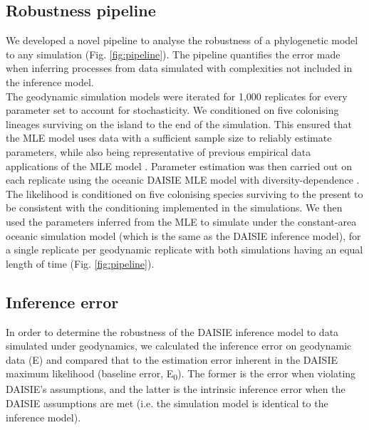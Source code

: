 \documentclass{article}
\begin{document}
\subsection*{Robustness pipeline}

We developed a novel pipeline to analyse the robustness of a phylogenetic model to any simulation (Fig. \ref{fig:pipeline}). The pipeline quantifies the error made when inferring processes from data simulated with complexities not included in the inference model. \\

The geodynamic simulation models were iterated for 1,000 replicates for every parameter set to account for stochasticity. We conditioned on five colonising lineages surviving on the island to the end of the simulation. This ensured that the MLE model uses data with a sufficient sample size to reliably estimate parameters, while also being representative of previous empirical data applications of the MLE model \citep{valente_using_2018}. Parameter estimation was then carried out on each replicate using the oceanic DAISIE MLE model with diversity-dependence \citep{valente_equilibrium_2015}. The likelihood is conditioned on five colonising species surviving to the present to be consistent with the conditioning implemented in the simulations. We then used the parameters inferred from the MLE to simulate under the constant-area oceanic simulation model (which is the same as the DAISIE inference model), for a single replicate per geodynamic replicate with both simulations having an equal length of time (Fig. \ref{fig:pipeline}). 

\subsection*{Inference error}

In order to determine the robustness of the DAISIE inference model to data simulated under geodynamics, we calculated the inference error on geodynamic data (E) and compared that to the estimation error inherent in the DAISIE maximum likelihood (baseline error, E\textsubscript{0}). The former is the error when violating DAISIE’s assumptions, and the latter is the intrinsic inference error when the DAISIE assumptions are met (i.e. the simulation model is identical to the inference model). \\
\end{document}
